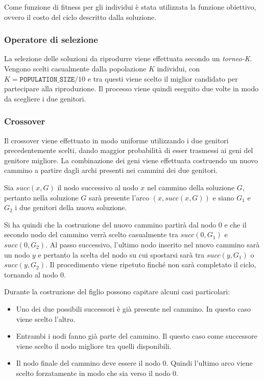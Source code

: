 Come funzione di fitness per gli individui è stata utilizzata la funzione obiettivo, ovvero il costo del ciclo descritto dalla soluzione.

\subsubsection{Operatore di selezione}

La selezione delle soluzioni da riprodurre viene effettuata secondo un \textit{torneo-K}. Vengono scelti casualmente dalla popolazione $K$ individui, con $K = \texttt{POPULATION\_SIZE}/10$ e tra questi viene scelto il miglior candidato per partecipare alla riproduzione.
Il processo viene quindi eseguito due volte in modo da scegliere i due genitori.

\subsubsection{Crossover}

Il crossover viene effettuato in modo uniforme utilizzando i due genitori precedentemente scelti, dando maggior probabilità di esser trasmessi ai geni del genitore migliore.
La combinazione dei geni viene effettuata costruendo un nuovo cammino a partire dagli archi presenti nei cammini dei due genitori.

Sia $succ(x, G)$ il nodo successivo al nodo $x$ nel cammino della soluzione $G$, pertanto nella soluzione $G$ sarà presente l'arco $(x, succ(x,G))$ e siano $G_1$ e $G_2$ i due genitori della nuova soluzione.

Si ha quindi che la costruzione del nuovo cammino partirà dal nodo 0 e che il secondo nodo del cammino verrà scelto casualmente tra $succ(0,G_1)$ e $succ(0,G_2)$.
Al passo successivo, l'ultimo nodo inserito nel nuovo cammino sarà un nodo $y$ e pertanto la scelta del nodo su cui spostarsi sarà tra $succ(y,G_1)$ o $succ(y, G_2)$.
Il procedimento viene ripetuto finché non sarà completato il ciclo, tornando al nodo 0.

Durante la costruzione del figlio possono capitare alcuni casi particolari:

\begin{itemize}
	\item Uno dei due possibili successori è già presente nel cammino. In questo caso viene scelto l'altro.
	\item Entrambi i nodi fanno già parte del cammino. Il questo caso come successore viene scelto il nodo migliore tra quelli disponibili.
	\item Il nodo finale del cammino deve essere il nodo 0. Quindi l'ultimo arco viene scelto forzatamente in modo che sia verso il nodo 0.
\end{itemize}

